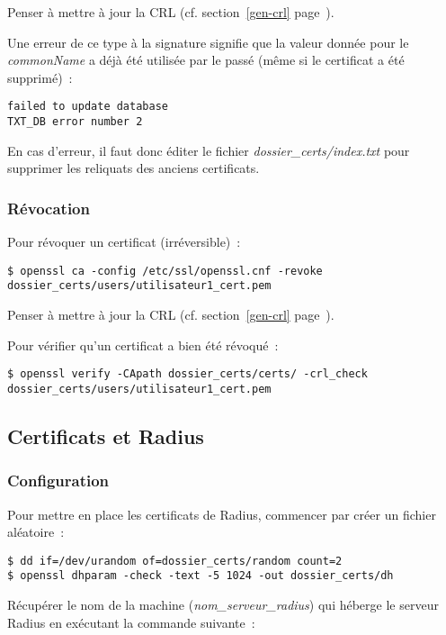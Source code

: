 Penser à mettre à jour la CRL (cf. section~\ref{gen-crl} page~\pageref{gen-crl}).

Une erreur de ce type à la signature signifie que la valeur donnée pour le \emph{commonName} a déjà été utilisée par le passé (même si le certificat a été supprimé)~:

\begin{lstlisting}
failed to update database
TXT_DB error number 2
\end{lstlisting}

En cas d'erreur, il faut donc éditer le fichier \emph{dossier\_certs/index.txt} pour supprimer les reliquats des anciens certificats.

\subsubsection{Révocation}

Pour révoquer un certificat (irréversible)~: 

\begin{lstlisting}
$ openssl ca -config /etc/ssl/openssl.cnf -revoke dossier_certs/users/utilisateur1_cert.pem
\end{lstlisting}

Penser à mettre à jour la CRL (cf. section~\ref{gen-crl} page~\pageref{gen-crl}).

Pour vérifier qu'un certificat a bien été révoqué~:

\begin{lstlisting}
$ openssl verify -CApath dossier_certs/certs/ -crl_check dossier_certs/users/utilisateur1_cert.pem
\end{lstlisting}

\subsection{Certificats et Radius}
\subsubsection{Configuration}

Pour mettre en place les certificats de Radius, commencer par créer un fichier aléatoire~: 

\begin{lstlisting}
$ dd if=/dev/urandom of=dossier_certs/random count=2
$ openssl dhparam -check -text -5 1024 -out dossier_certs/dh
\end{lstlisting}

Récupérer le nom de la machine (\emph{nom\_serveur\_radius}) qui héberge le serveur Radius en exécutant la commande suivante~:

